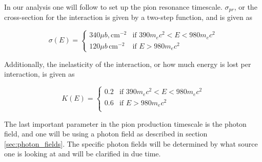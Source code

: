 In our analysis one will follow \cite{BHradiation} to set up the pion resonance timescale. $\sigma_{pr}$, or the cross-section for the interaction is given by a two-step function, and is given as

\begin{equation}
    \sigma(E) = 
    \begin{cases} 
    340 \mu b, \text{cm}^{-2} & \text{if } 390 m_e c^2 < E < 980 m_e c^2 \\
    120 \mu b \, \text{cm}^{-2} & \text{if } E > 980 m_e c^2 
    \end{cases}
\end{equation}

Additionally, the inelasticity of the interaction, or how much energy is lost per interaction, is given as

\begin{equation}
    K(E) = 
    \begin{cases} 
    0.2 & \text{if } 390 m_e c^2 < E < 980 m_e c^2 \\
    0.6 & \text{if } E > 980 m_e c^2 \\
    \end{cases}
\end{equation}



The last important parameter in the pion production timescale is the photon field, and one will be using a photon field as described in section \ref{sec:photon_fields}. The specific photon fields will be determined by what source one is looking at and will be clarified in due time.
